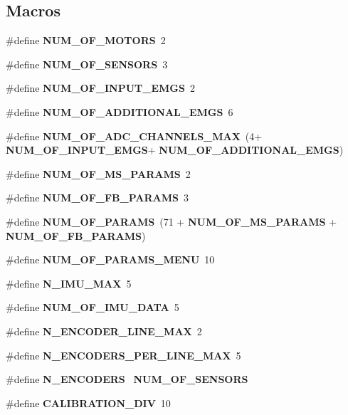 \subsection*{Macros}
\begin{DoxyCompactItemize}
\item 
\#define \textbf{ N\+U\+M\+\_\+\+O\+F\+\_\+\+M\+O\+T\+O\+RS}~2
\item 
\#define \textbf{ N\+U\+M\+\_\+\+O\+F\+\_\+\+S\+E\+N\+S\+O\+RS}~3
\item 
\#define \textbf{ N\+U\+M\+\_\+\+O\+F\+\_\+\+I\+N\+P\+U\+T\+\_\+\+E\+M\+GS}~2
\item 
\#define \textbf{ N\+U\+M\+\_\+\+O\+F\+\_\+\+A\+D\+D\+I\+T\+I\+O\+N\+A\+L\+\_\+\+E\+M\+GS}~6
\item 
\mbox{\label{globals_8h_a94a49570e3bc73b67084f1a9ae90d89a}} 
\#define {\bfseries N\+U\+M\+\_\+\+O\+F\+\_\+\+A\+D\+C\+\_\+\+C\+H\+A\+N\+N\+E\+L\+S\+\_\+\+M\+AX}~(4+\textbf{ N\+U\+M\+\_\+\+O\+F\+\_\+\+I\+N\+P\+U\+T\+\_\+\+E\+M\+GS}+\textbf{ N\+U\+M\+\_\+\+O\+F\+\_\+\+A\+D\+D\+I\+T\+I\+O\+N\+A\+L\+\_\+\+E\+M\+GS})
\item 
\#define \textbf{ N\+U\+M\+\_\+\+O\+F\+\_\+\+M\+S\+\_\+\+P\+A\+R\+A\+MS}~2
\item 
\#define \textbf{ N\+U\+M\+\_\+\+O\+F\+\_\+\+F\+B\+\_\+\+P\+A\+R\+A\+MS}~3
\item 
\#define \textbf{ N\+U\+M\+\_\+\+O\+F\+\_\+\+P\+A\+R\+A\+MS}~(71 + \textbf{ N\+U\+M\+\_\+\+O\+F\+\_\+\+M\+S\+\_\+\+P\+A\+R\+A\+MS} + \textbf{ N\+U\+M\+\_\+\+O\+F\+\_\+\+F\+B\+\_\+\+P\+A\+R\+A\+MS})
\item 
\#define \textbf{ N\+U\+M\+\_\+\+O\+F\+\_\+\+P\+A\+R\+A\+M\+S\+\_\+\+M\+E\+NU}~10
\item 
\mbox{\label{globals_8h_a8e4d7a571850d3268c9b780b171474e6}} 
\#define {\bfseries N\+\_\+\+I\+M\+U\+\_\+\+M\+AX}~5
\item 
\mbox{\label{globals_8h_a7016adad486a9166338f1667813d8b5c}} 
\#define {\bfseries N\+U\+M\+\_\+\+O\+F\+\_\+\+I\+M\+U\+\_\+\+D\+A\+TA}~5
\item 
\#define \textbf{ N\+\_\+\+E\+N\+C\+O\+D\+E\+R\+\_\+\+L\+I\+N\+E\+\_\+\+M\+AX}~2
\item 
\#define \textbf{ N\+\_\+\+E\+N\+C\+O\+D\+E\+R\+S\+\_\+\+P\+E\+R\+\_\+\+L\+I\+N\+E\+\_\+\+M\+AX}~5
\item 
\mbox{\label{globals_8h_a3b87e4129f51a9ee36bdfb06ea0a9268}} 
\#define {\bfseries N\+\_\+\+E\+N\+C\+O\+D\+E\+RS}~\textbf{ N\+U\+M\+\_\+\+O\+F\+\_\+\+S\+E\+N\+S\+O\+RS}
\item 
\#define \textbf{ C\+A\+L\+I\+B\+R\+A\+T\+I\+O\+N\+\_\+\+D\+IV}~10

\end{DoxyCompactItemize}
